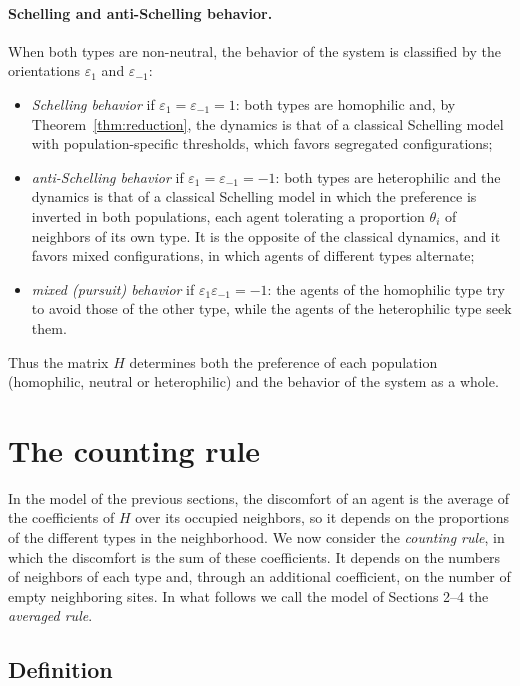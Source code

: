 \documentclass{article}
\theoremstyle{remark}
\begin{document}
\paragraph{Schelling and anti-Schelling behavior.} When both types are non-neutral, the behavior of the system is classified by the orientations $\varepsilon_1$ and $\varepsilon_{-1}$:
\begin{itemize}
    \item \emph{Schelling behavior} if $\varepsilon_1=\varepsilon_{-1}=1$: both types are homophilic and, by Theorem~\ref{thm:reduction}, the dynamics is that of a classical Schelling model with population-specific thresholds, which favors segregated configurations;
    \item \emph{anti-Schelling behavior} if $\varepsilon_1=\varepsilon_{-1}=-1$: both types are heterophilic and the dynamics is that of a classical Schelling model in which the preference is inverted in both populations, each agent tolerating a proportion $\theta_i$ of neighbors of its own type. It is the opposite of the classical dynamics, and it favors mixed configurations, in which agents of different types alternate;
    \item \emph{mixed (pursuit) behavior} if $\varepsilon_1 \varepsilon_{-1}=-1$: the agents of the homophilic type try to avoid those of the other type, while the agents of the heterophilic type seek them.
\end{itemize}
Thus the matrix $H$ determines both the preference of each population (homophilic, neutral or heterophilic) and the behavior of the system as a whole.


\section{The counting rule}\label{sec:counting}

In the model of the previous sections, the discomfort of an agent is the average of the coefficients of $H$ over its occupied neighbors, so it depends on the proportions of the different types in the neighborhood. We now consider the \emph{counting rule}, in which the discomfort is the sum of these coefficients. It depends on the numbers of neighbors of each type and, through an additional coefficient, on the number of empty neighboring sites. In what follows we call the model of Sections 2--4 the \emph{averaged rule}.

\subsection{Definition}
\end{document}
